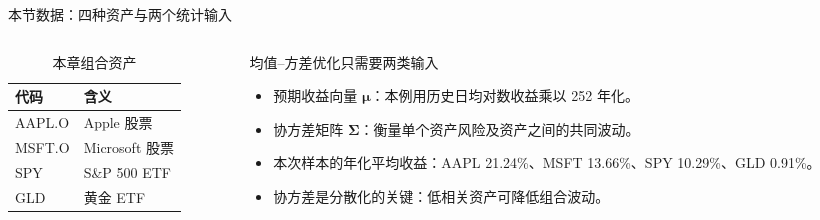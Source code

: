 \documentclass[9pt]{ctexbeamer}
\begin{document}
\begin{frame}{本节数据：四种资产与两个统计输入}
  \begin{columns}[T,totalwidth=\textwidth]
    \begin{column}{0.40\textwidth}
      \begin{table}
        \centering
        \caption{本章组合资产}
        \begin{tabular}{ll}
          \toprule
          代码 & 含义 \\
          \midrule
          AAPL.O & Apple 股票 \\
          MSFT.O & Microsoft 股票 \\
          SPY & S\&P 500 ETF \\
          GLD & 黄金 ETF \\
          \bottomrule
        \end{tabular}
      \end{table}
    \end{column}
    \begin{column}{0.55\textwidth}
      \begin{block}{均值--方差优化只需要两类输入}
        \begin{itemize}
          \item 预期收益向量 $\bm{\mu}$：本例用历史日均对数收益乘以 252 年化。
          \item 协方差矩阵 $\bm{\Sigma}$：衡量单个资产风险及资产之间的共同波动。
        \end{itemize}
      \end{block}
      \begin{itemize}
        \item 本次样本的年化平均收益：AAPL 21.24\%、MSFT 13.66\%、SPY 10.29\%、GLD 0.91\%。
        \item \alert{协方差}是分散化的关键：低相关资产可降低组合波动。
      \end{itemize}
    \end{column}
  \end{columns}
\end{frame}
\end{document}
